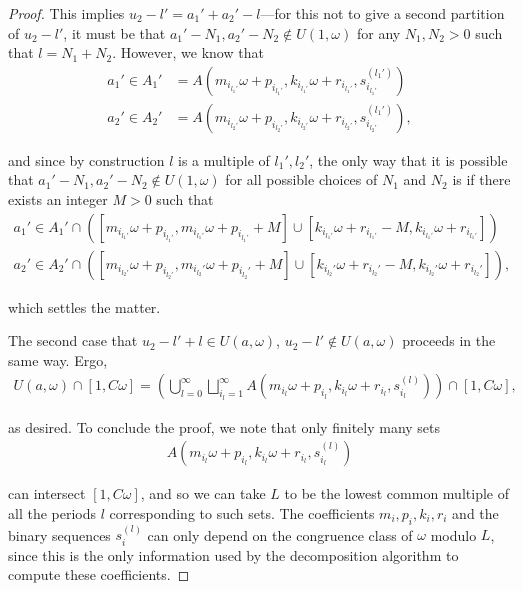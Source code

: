 \documentclass{amsart}
\theoremstyle{theorem}
\theoremstyle{definition}
\begin{document}
\begin{proof}
This implies $u_2 - l' = a_1' + a_2' - l$---for this not to give a second partition of $u_2 - l'$, it must be that $a_1' - N_1, a_2' - N_2 \notin U(1,\omega)$ for any $N_1,N_2 > 0$ such that $l = N_1 + N_2$. However, we know that
	\begin{align*}
	a_1' \in A_1' &= A\left(m_{i_{l_1'}}\omega + p_{i_{l_1'}}, k_{i_{l_1'}}\omega + r_{i_{l_1'}},s^{(l_1')}_{i_{l_1'}}\right) \\
	a_2' \in A_2' &= A\left(m_{i_{l_2'}}\omega + p_{i_{l_2'}}, k_{i_{l_2'}}\omega + r_{i_{l_2'}},s^{(l_1')}_{i_{l_2'}}\right),
	\end{align*}
		
\noindent and since by construction $l$ is a multiple of $l_1', l_2'$, the only way that it is possible that $a_1' - N_1, a_2' - N_2 \notin U(1,\omega)$ for all possible choices of $N_1$ and $N_2$ is if there exists an integer $M > 0$ such that
	\begin{align*}
	a_1' \in A_1' \cap \left([m_{i_{l_1'}}\omega + p_{i_{l_1'}}, m_{i_{l_1'}}\omega + p_{i_{l_1'}} + M] \cup [k_{i_{l_1'}}\omega + r_{i_{l_1'}} - M, k_{i_{l_1'}}\omega + r_{i_{l_1'}}]\right) \\
	a_2' \in A_2' \cap \left([m_{i_{l_2'}}\omega + p_{i_{l_2'}}, m_{i_{l_2}'}\omega + p_{i_{l_2}'} + M] \cup [k_{i_{l_2}'}\omega + r_{i_{l_2}'} - M, k_{i_{l_2}'}\omega + r_{i_{l_2}'}]\right),
	\end{align*}
		
\noindent which settles the matter.
	
The second case that $u_2 - l' + l \in U(a,\omega)$, $u_2 - l' \notin U(a,\omega)$ proceeds in the same way. Ergo,
	\begin{align*}
	U(a,\omega) \cap [1,C\omega] = \left(\bigcup_{l = 0}^\infty\bigsqcup_{i_l = 1}^\infty A\left(m_{i_l}\omega + p_{i_l}, k_{i_l}\omega + r_{i_l},s^{(l)}_{i_l}\right)\right) \cap [1,C\omega],
	\end{align*}
		
\noindent as desired. To conclude the proof, we note that only finitely many sets
	\begin{align*}
	A\left(m_{i_l}\omega + p_{i_l}, k_{i_l}\omega + r_{i_l},s^{(l)}_{i_l}\right)
	\end{align*}
		
\noindent can intersect $[1,C\omega]$, and so we can take $L$ to be the lowest common multiple of all the periods $l$ corresponding to such sets. The coefficients $m_i, p_i, k_i, r_i$ and the binary sequences $s_i^{(l)}$ can only depend on the congruence class of $\omega$ modulo $L$, since this is the only information used by the decomposition algorithm to compute these coefficients.
	

\end{proof}
\end{document}
